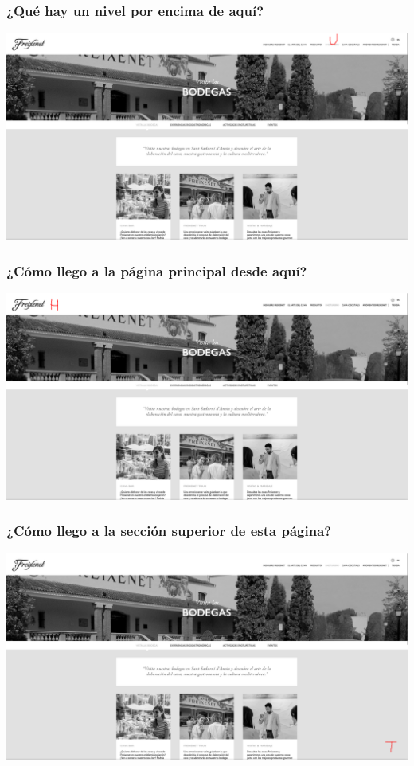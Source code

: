 \documentclass[spanish]{article}
\begin{document}
\subsubsection{¿Qué hay un nivel por encima de aquí?}

\begin{center}
        \includegraphics[scale=.1]{../img/5.png}
\end{center}

\subsubsection{¿Cómo llego a la página principal desde aquí?}

\begin{center}
        \includegraphics[scale=.1]{../img/6.png}
\end{center}

\subsubsection{¿Cómo llego a la sección superior de esta página?}

\begin{center}
        \includegraphics[scale=.1]{../img/7.png}
\end{center}
\end{document}
